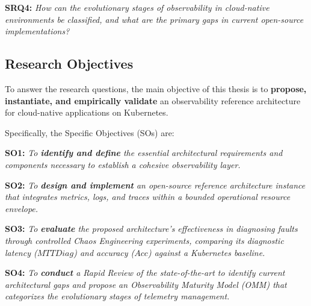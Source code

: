 \textbf{SRQ4:} \textit{How can the evolutionary stages of observability in cloud-native environments be classified, and what are the primary gaps in current open-source implementations?}

\subsection{Research Objectives}

To answer the research questions, the main objective of this thesis is to \textbf{propose, instantiate, and empirically validate} an observability reference architecture for cloud-native applications on Kubernetes.

Specifically, the Specific Objectives (SOs) are:

\textbf{SO1:} \textit{To \textbf{identify and define} the essential architectural requirements and components necessary to establish a cohesive observability layer.}

\textbf{SO2:} \textit{To \textbf{design and implement} an open-source reference architecture instance that integrates metrics, logs, and traces within a bounded operational resource envelope.}

\textbf{SO3:} \textit{To \textbf{evaluate} the proposed architecture's effectiveness in diagnosing faults through controlled Chaos Engineering experiments, comparing its diagnostic latency ($MTTDiag$) and accuracy ($Acc$) against a Kubernetes baseline.}

\textbf{SO4:} \textit{To \textbf{conduct} a Rapid Review of the state-of-the-art to identify current architectural gaps and propose an Observability Maturity Model (OMM) that categorizes the evolutionary stages of telemetry management.}
